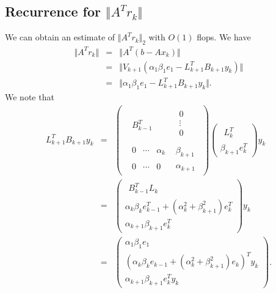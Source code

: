 \documentclass[11pt]{article}
\begin{document}
\subsection{Recurrence for $\Vert A^T r_k \Vert$}
We can obtain an estimate of $\Vert A^T r_k \Vert_2$ with $O(1)$ flops. We have
\begin{eqnarray*}
\Vert A^T r_k \Vert &=& \Vert A^T (b - Ax_k) \Vert \\
&=& \Vert V_{k+1} (\alpha_1 \beta_1 e_1 - L^T_{k+1} B_{k+1} y_k) \Vert \\
&=& \Vert \alpha_1 \beta_1 e_1 - L^T_{k+1} B_{k+1} y_k \Vert.
\end{eqnarray*}
We note that
\begin{eqnarray*}
L_{k+1}^T B_{k+1} y_k &=& 
\begin{pmatrix} \begin{array}{c|c}
\begin{matrix} B^T_{k-1} \end{matrix}
&  \begin{matrix} 0 \\ \vdots \\ 0 \\  \end{matrix} \\
\hline
\begin{matrix} 0 & \cdots & \alpha_k \end{matrix} & \beta_{k+1} \\
\hline
\begin{matrix} 0 & \cdots &  0 \end{matrix} & \alpha_{k+1}
\end{array}\end{pmatrix}
\begin{pmatrix}
\begin{matrix} L^T_{k} \end{matrix} \\
\beta_{k+1} e_k^T
\end{pmatrix} y_k \\
&=&
\begin{pmatrix}
\begin{matrix} B^T_{k-1} L_k \end{matrix} \\
\alpha_k \beta_k e^T_{k-1} + (\alpha^2_k + \beta^2_{k+1}) e^T_k \\
\alpha_{k+1} \beta_{k+1} e^T_{k}
\end{pmatrix} y_k \\
&=&
\begin{pmatrix}
\alpha_1 \beta_1 e_1 \\ (\alpha_k \beta_k e_{k-1} + (\alpha^2_k + \beta^2_{k+1}) e_k)^T y_k \\ \alpha_{k+1} \beta_{k+1} e^T_{k} y_k
\end{pmatrix}.
\end{eqnarray*}
\end{document}
